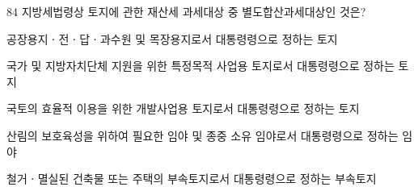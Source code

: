\begin{question}{84}
지방세법령상 토지에 관한 재산세 과세대상 중 별도합산과세대상인 것은?
\begin{choices}
  \item 공장용지ㆍ전ㆍ답ㆍ과수원 및 목장용지로서 대통령령으로 정하는 토지
  \item 국가 및 지방자치단체 지원을 위한 특정목적 사업용 토지로서 대통령령으로 정하는 토지
  \item 국토의 효율적 이용을 위한 개발사업용 토지로서 대통령령으로 정하는 토지
  \item 산림의 보호육성을 위하여 필요한 임야 및 종중 소유 임야로서 대통령령으로 정하는 임야
  \item 철거ㆍ멸실된 건축물 또는 주택의 부속토지로서 대통령령으로 정하는 부속토지
\end{choices}
\end{question}

